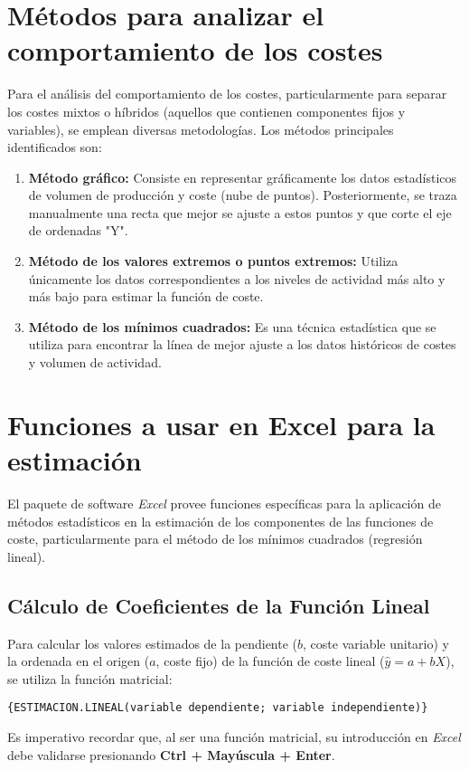 \section{Métodos para analizar el comportamiento de los costes}

Para el análisis del comportamiento de los costes, particularmente para separar los costes mixtos o híbridos (aquellos que contienen componentes fijos y variables), se emplean diversas metodologías. Los métodos principales identificados son:

\begin{enumerate}
    \item \textbf{Método gráfico:} Consiste en representar gráficamente los datos estadísticos de volumen de producción y coste (nube de puntos). Posteriormente, se traza manualmente una recta que mejor se ajuste a estos puntos y que corte el eje de ordenadas "Y".
    \item \textbf{Método de los valores extremos o puntos extremos:} Utiliza únicamente los datos correspondientes a los niveles de actividad más alto y más bajo para estimar la función de coste.
    \item \textbf{Método de los mínimos cuadrados:} Es una técnica estadística que se utiliza para encontrar la línea de mejor ajuste a los datos históricos de costes y volumen de actividad.
\end{enumerate}

\section{Funciones a usar en Excel para la estimación}

El paquete de software \textit{Excel} provee funciones específicas para la aplicación de métodos estadísticos en la estimación de los componentes de las funciones de coste, particularmente para el método de los mínimos cuadrados (regresión lineal).

\subsection{Cálculo de Coeficientes de la Función Lineal}
Para calcular los valores estimados de la pendiente ($b$, coste variable unitario) y la ordenada en el origen ($a$, coste fijo) de la función de coste lineal ($\hat{y} = a + bX$), se utiliza la función matricial:
\begin{lstlisting}[style=elegant, basicstyle=\ttfamily\small]
{ESTIMACION.LINEAL(variable dependiente; variable independiente)}
\end{lstlisting}
Es imperativo recordar que, al ser una función matricial, su introducción en \textit{Excel} debe validarse presionando \textbf{Ctrl + Mayúscula + Enter}.

